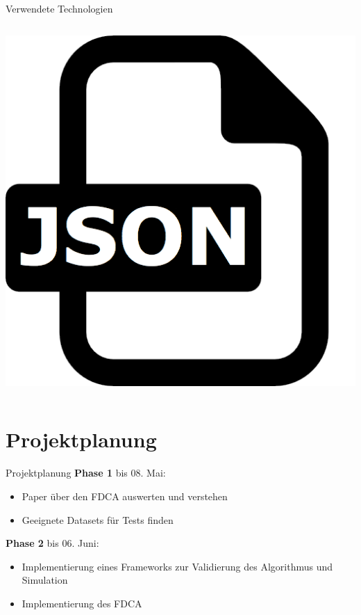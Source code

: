 \documentclass[12pt, xcolor={usenames,dvipsnames,svgnames,x11names,table}]{beamer}
\begin{document}
\begin{frame}{Verwendete Technologien}{}
\begin{columns}[c, onlytextwidth]
			\begin{column}{.5\textwidth}
				\center \includegraphics[scale=.08]{json}
			\end{column}
		\end{columns}
	\end{frame}
	
	
	\section{Projektplanung}
	\begin{frame}{Projektplanung}{}
		\textbf{Phase 1} bis 08. Mai:
		\begin{itemize}
			\item Paper über den FDCA auswerten und verstehen
			\item Geeignete Datasets für Tests finden
		\end{itemize}\bigskip
		
		\textbf{Phase 2} bis 06. Juni:
		\begin{itemize}
			\item Implementierung eines Frameworks zur Validierung des Algorithmus und Simulation
			\item Implementierung des FDCA
		\end{itemize}
	\end{frame}
	
\end{document}
